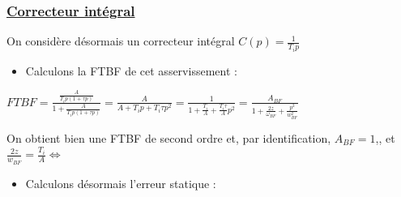 \documentclass[12pt]{article}
\begin{document}
\subsubsection{\underline{\bf Correcteur intégral}}

On considère désormais un correcteur intégral $C(p) = \frac{1}{T_ip}$

\begin{itemize}
    \item Calculons la FTBF de cet asservissement : 
\end{itemize}
\begin{center}
    \large $FTBF = \frac{\frac{A}{T_ip(1+\tau p)}}{1 + \frac{A}{T_ip(1+\tau p)}} = \frac{A}{A + T_ip + T_i\tau p^2} = \frac{1}{1 + \frac{T_i}{A} + \frac{T_i \tau}{A}p^2} = \frac{A_{BF}}{1 + \frac{2z}{\omega_{BF}} + \frac{p^2}{w_{BF}^2}}$

\end{center}
\normalsize On obtient bien une FTBF de second ordre et, par identification, $A_{BF} = 1$,, et $\frac{2z}{w_{BF}} = \frac{T_i}{A} \Leftrightarrow $

\begin{itemize}
    \item Calculons désormais l'erreur statique : 
\end{itemize}
\end{document}
